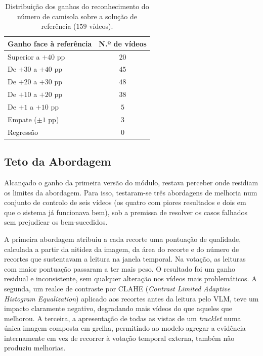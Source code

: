 \begin{table}[htbp]
    \centering
    \caption{Distribuição dos ganhos do reconhecimento do número de camisola sobre a solução de referência ($159$ vídeos).}
    \label{tab:jnr-distribuicao}
    \begin{tabular}{|l|c|}
        \hline
        \textbf{Ganho face à referência} & \textbf{N.º de vídeos} \\
        \hline
        Superior a $+40$ pp & $20$ \\
        \hline
        De $+30$ a $+40$ pp & $45$ \\
        \hline
        De $+20$ a $+30$ pp & $48$ \\
        \hline
        De $+10$ a $+20$ pp & $38$ \\
        \hline
        De $+1$ a $+10$ pp  & $5$ \\
        \hline
        Empate ($\pm 1$ pp) & $3$ \\
        \hline
        Regressão           & $0$ \\
        \hline
    \end{tabular}
\end{table}


\subsection{Teto da Abordagem}\label{sec:res_jnr_teto}

Alcançado o ganho da primeira versão do módulo, restava perceber onde residiam os limites da abordagem. Para isso, testaram-se três abordagens de melhoria num conjunto de controlo de seis vídeos (os quatro com piores resultados e dois em que o sistema já funcionava bem), sob a premissa de resolver os casos falhados sem prejudicar os bem-sucedidos.

A primeira abordagem atribuiu a cada recorte uma pontuação de qualidade, calculada a partir da nitidez da imagem, da área do recorte e do número de recortes que sustentavam a leitura na janela temporal. Na votação, as leituras com maior pontuação passaram a ter mais peso. O resultado foi um ganho residual e inconsistente, sem qualquer alteração nos vídeos mais problemáticos. A segunda, um realce de contraste por CLAHE (\emph{Contrast Limited Adaptive Histogram Equalization}) aplicado aos recortes antes da leitura pelo VLM, teve um impacto claramente negativo, degradando mais vídeos do que aqueles que melhorou. A terceira, a apresentação de todas as vistas de um \emph{tracklet} numa única imagem composta em grelha, permitindo ao modelo agregar a evidência internamente em vez de recorrer à votação temporal externa, também não produziu melhorias.

